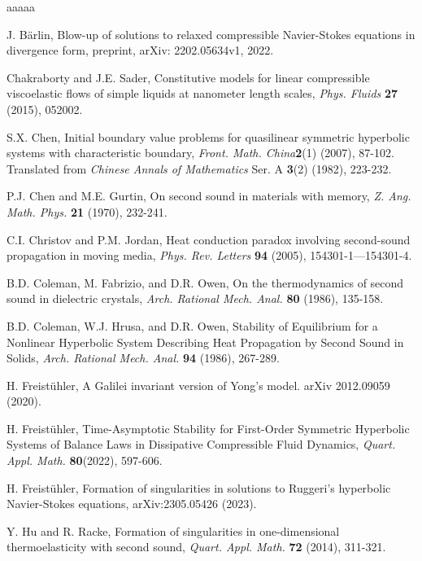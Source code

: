 \documentclass[10pt,reqno]{amsart}
\numberwithin{equation}{section}
\begin{document}
 \begin{thebibliography}{aaaaa}


 J. B\"arlin, Blow-up of solutions to relaxed compressible Navier-Stokes equations in divergence form, preprint, arXiv: 2202.05634v1, 2022.

 Chakraborty and J.E. Sader, Constitutive models for linear compressible viscoelastic flows of simple liquids at nanometer length scales, {\it Phys. Fluids} {\bf 27} (2015), 052002.

 S.X. Chen, Initial boundary value problems for quasilinear symmetric hyperbolic systems with characteristic boundary, {\it Front. Math. China}{\bf 2}(1) (2007), 87-102. Translated from {\it 
Chinese Annals of Mathematics} Ser. A {\bf 3}(2) (1982), 223-232. 

 P.J. Chen and M.E. Gurtin, On second sound in materials with memory, {\it Z. Ang. Math. Phys.} {\bf 21} (1970), 232-241.


  C.I. Christov and P.M. Jordan, Heat conduction paradox involving second-sound propagation in moving media, {\it Phys. Rev. Letters} {\bf 94} (2005), 154301-1---154301-4.

 B.D. Coleman, M. Fabrizio, and D.R. Owen, On the thermodynamics of second sound in dielectric crystals, {\it Arch. Rational Mech. Anal.} {\bf 80} (1986), 135-158.

     B.D. Coleman, W.J. Hrusa, and D.R. Owen, Stability of Equilibrium for a Nonlinear Hyperbolic System Describing Heat Propagation by Second Sound in Solids, {\it Arch. Rational Mech. Anal.} {\bf 94} (1986), 267-289.



 H. Freist\"uhler, A Galilei invariant version of Yong’s model. arXiv 2012.09059 (2020).

 H. Freist\"uhler, Time-Asymptotic Stability for First-Order Symmetric Hyperbolic Systems of Balance Laws in Dissipative Compressible Fluid Dynamics, {\it  Quart. Appl. Math.} {\bf 80}(2022), 597-606.


 H. Freist\"uhler, Formation of singularities in solutions to Ruggeri's hyperbolic Navier-Stokes equations, arXiv:2305.05426 (2023).


 Y. Hu and R. Racke, Formation of singularities in one-dimensional thermoelasticity with second sound, {\it Quart. Appl. Math.} {\bf 72} (2014), 311-321.


\end{thebibliography}
\end{document}
